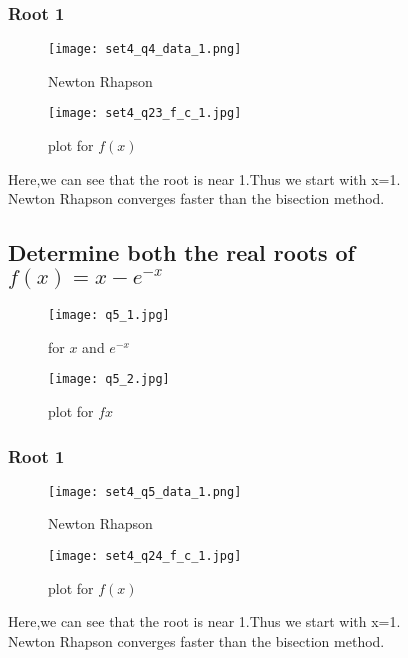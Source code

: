 \documentclass[a4paper]{article}
\begin{document}
        \subsubsection{Root 1}
            \begin{figure}[!htbp]
              \centering
              \begin{minipage}[b]{0.45\textwidth}
\texttt{[image: set4\_q4\_data\_1.png]}
                \caption{Newton Rhapson }
              \end{minipage}
              \hfill
              \begin{minipage}[b]{0.45\textwidth}
                \texttt{[image: set4\_q23\_f\_c\_1.jpg]}
                \caption{plot for $f(x)$}
              \end{minipage}
            \end{figure}
           \Large{Here,we can see that the root is near 1.Thus we start with x=1.\\Newton Rhapson converges faster than the bisection method.}
        \newpage
         \subsection{Determine both the real roots of  $f(x)=x- e^{-x}$}
            \begin{figure}[!htbp]
              \centering
              \begin{minipage}[b]{0.45\textwidth}
                \texttt{[image: q5\_1.jpg]}
                \caption{ for $x$ and $e^{-x}$ }
              \end{minipage}
              \hfill
              \begin{minipage}[b]{0.45\textwidth}
                \texttt{[image: q5\_2.jpg]}
                \caption{plot for $f{x}$}
              \end{minipage}
            \end{figure}
        \subsubsection{Root 1}
             \begin{figure}[!htbp]
              \centering
              \begin{minipage}[b]{0.45\textwidth}
\texttt{[image: set4\_q5\_data\_1.png]}
                \caption{Newton Rhapson }
              \end{minipage}
              \hfill
              \begin{minipage}[b]{0.45\textwidth}
                \texttt{[image: set4\_q24\_f\_c\_1.jpg]}
                \caption{plot for $f(x)$}
              \end{minipage}
            \end{figure}
            \Large{Here,we can see that the root is near 1.Thus we start with x=1.\\Newton Rhapson converges faster than the bisection method.}
        \newpage
\end{document}
